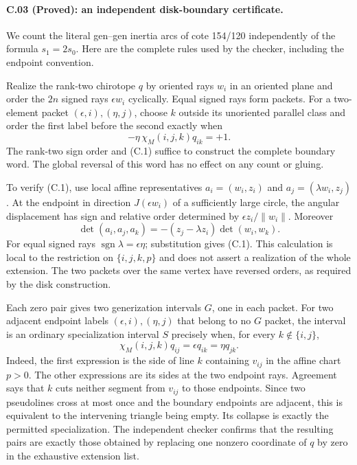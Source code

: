 \paragraph{C.03 (Proved): an independent disk-boundary certificate.}
We count the literal gen--gen inertia arcs of cote 154/120 independently
of the formula $s_1=2s_0$. Here are the complete rules used by the
checker, including the endpoint convention.

Realize the rank-two chirotope $q$ by oriented rays $w_i$ in an
oriented plane and order the $2n$ signed rays $\epsilon w_i$
cyclically. Equal signed rays form packets. For a two-element packet
$(\epsilon,i),(\eta,j)$, choose $k$ outside its unoriented parallel
class and order the first label before the second exactly when
\[
 -\eta\,\chi_M(i,j,k)q_{ik}=+1.                 \tag{C.1}
\]
The rank-two sign order and (C.1) suffice to construct the complete
boundary word. The global reversal of this word has no effect on
any count or gluing.

To verify (C.1), use local affine representatives
$a_i=(w_i,z_i)$ and $a_j=(\lambda w_i,z_j)$. At the endpoint in
direction $J(\epsilon w_i)$ of a sufficiently large circle,
the angular displacement has sign and relative order determined by
$\epsilon z_i/\lVert w_i\rVert$. Moreover
\[
 \det(a_i,a_j,a_k)
 =-(z_j-\lambda z_i)\det(w_i,w_k).
\]
For equal signed rays $\operatorname{sgn}\lambda=\epsilon\eta$;
substitution gives (C.1). This calculation is local to the
restriction on $\{i,j,k,p\}$ and does not assert a realization of
the whole extension. The two packets over the same vertex have
reversed orders, as required by the disk construction.

Each zero pair gives two generization intervals $G$, one in each
packet. For two adjacent endpoint labels $(\epsilon,i),(\eta,j)$
that belong to no $G$ packet, the interval is an ordinary
specialization interval $S$ precisely when, for every
$k\notin\{i,j\}$,
\[
 \chi_M(i,j,k)q_{ij}
     =\epsilon q_{ik}=\eta q_{jk}.             \tag{C.2}
\]
Indeed, the first expression is the side of line $k$ containing
$v_{ij}$ in the affine chart $p>0$. The other expressions are its
sides at the two endpoint rays. Agreement says that $k$ cuts neither
segment from $v_{ij}$ to those endpoints. Since two pseudolines
cross at most once and the boundary endpoints are adjacent, this
is equivalent to the intervening triangle being empty. Its
collapse is exactly the permitted specialization. The independent
checker confirms that the resulting pairs are exactly those
obtained by replacing one nonzero coordinate of $q$ by zero in
the exhaustive extension list.

